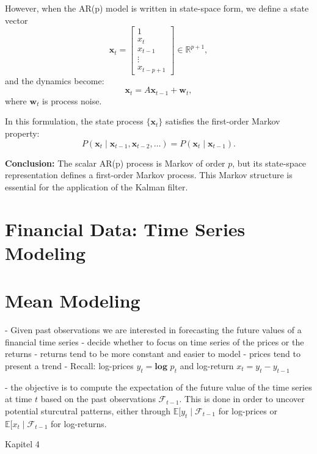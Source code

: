 However, when the AR(p) model is written in state-space form, we define a state vector
\[
\mathbf{x}_t =
\begin{bmatrix}
1 \\
x_t \\
x_{t-1} \\
\vdots \\
x_{t-p+1}
\end{bmatrix}
\in \mathbb{R}^{p+1},
\]
and the dynamics become:
\[
\mathbf{x}_t = A \mathbf{x}_{t-1} + \mathbf{w}_t,
\]
where \(\mathbf{w}_t\) is process noise.

In this formulation, the state process \(\{\mathbf{x}_t\}\) satisfies the first-order Markov property:
\[
P(\mathbf{x}_t \mid \mathbf{x}_{t-1}, \mathbf{x}_{t-2}, \dots) = P(\mathbf{x}_t \mid \mathbf{x}_{t-1}).
\]

\textbf{Conclusion:} The scalar AR(p) process is Markov of order \(p\), but its state-space representation defines a first-order Markov process. This Markov structure is essential for the application of the Kalman filter.



\section{Financial Data: Time Series Modeling}
\section{Mean Modeling}
- Given past observations we are interested in forecasting the future values of a financial time series
- decide whether to focus on time series of the prices or the returns
- returns tend to be more constant and easier to model 
- prices tend to present a trend 
- Recall: log-prices $y_t=\textbf{log }p_t$ and log-return $x_t= y_t-y_{t-1}$

- the objective is to compute the expectation of the future value of the time series at time $t$ based on the past observations $\mathcal{F}_{t-1}$. This is done in order to uncover potential sturcutral patterns, either through $\mathbb{E}[y_t \mid \mathcal{F}_{t-1}$ for log-prices or $\mathbb{E}[x_t \mid \mathcal{F}_{t-1}$ for log-returns. 


Kapitel 4

